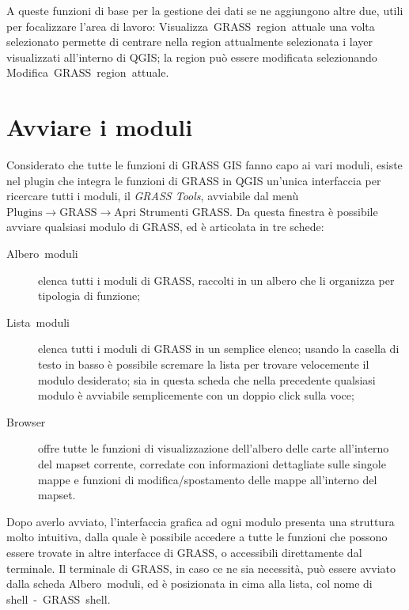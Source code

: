 	A queste funzioni di base per la gestione dei dati se ne aggiungono altre due, utili per focalizzare l'area di lavoro: \textsf{Visualizza~GRASS~region~attuale} una volta selezionato permette di centrare nella region attualmente selezionata i layer visualizzati all'interno di QGIS; la region può essere modificata selezionando \textsf{Modifica~GRASS~region~attuale}.

\section{Avviare i moduli}
	Considerato che tutte le funzioni di GRASS GIS fanno capo ai vari moduli, esiste nel plugin che integra le funzioni di GRASS in QGIS un'unica interfaccia per ricercare tutti i moduli, il \emph{GRASS Tools}, avviabile dal menù \textsf{$\text{Plugins}\rightarrow\text{GRASS}\rightarrow\text{Apri~Strumenti~GRASS}$}. Da questa finestra è possibile avviare qualsiasi modulo di GRASS, ed è articolata in tre schede:

	\begin{description}
		\item [{\textsf{Albero~moduli}}] elenca tutti i moduli di GRASS, raccolti in un albero che li organizza per tipologia di funzione;
		\item [{\textsf{Lista~moduli}}] elenca tutti i moduli di GRASS in un semplice elenco; usando la casella di testo in basso è possibile scremare la lista per trovare velocemente il modulo desiderato; sia in questa scheda che nella precedente qualsiasi modulo è avviabile semplicemente con un doppio click sulla voce;
		\item [{\textsf{Browser}}] offre tutte le funzioni di visualizzazione dell'albero delle carte all'interno del mapset corrente, corredate con informazioni dettagliate sulle singole mappe e funzioni di modifica/spostamento delle mappe all'interno del mapset.
	\end{description}
	
	Dopo averlo avviato, l'interfaccia grafica ad ogni modulo presenta una struttura molto intuitiva, dalla quale è possibile accedere a tutte le funzioni che possono essere trovate in altre interfacce di GRASS, o accessibili direttamente dal terminale. Il terminale di GRASS, in caso ce ne sia necessità, può essere avviato dalla scheda \textsf{Albero~moduli}, ed è posizionata in cima alla lista, col nome di \textsf{shell~-~GRASS~shell}.
